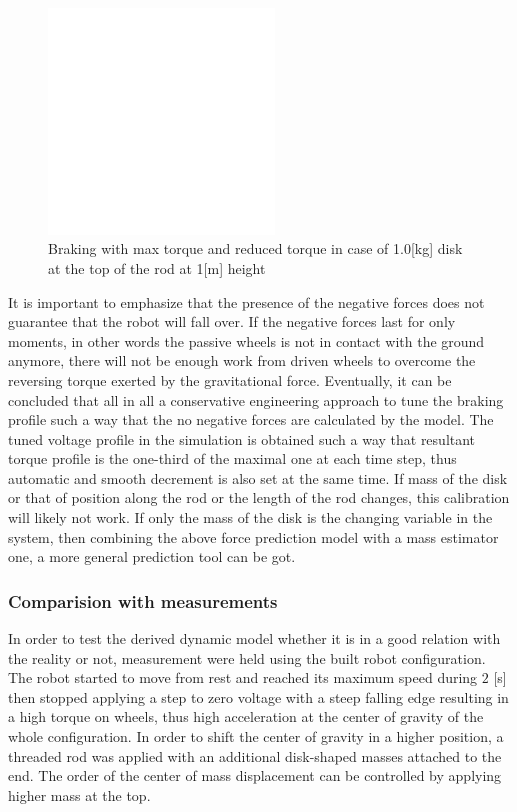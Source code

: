 \documentclass[12pt,english]{article}
\begin{document}
\begin{figure}[htb!]
	\centering
	\includegraphics[height=6cm]{figures/braking_1_0_kg_1_0_m}
	\caption{Braking with max torque and reduced torque in case of 1.0[kg] disk at the top of the rod at 1[m] height}
	\label{braking_1_0_kg_1_0_m}
\end{figure}
It is important to emphasize that the presence of the negative forces does not guarantee that the robot will fall over. If the negative forces last for only moments, in other words the passive wheels is not in contact with the ground anymore, there will not be enough work from driven wheels to overcome the reversing torque exerted by the gravitational force. Eventually, it can be concluded that all in all a conservative engineering approach to tune the braking profile such a way that the no negative forces are calculated by the model. The tuned voltage profile in the simulation is obtained such a way that resultant torque profile is the one-third of the maximal one at each time step, thus automatic and smooth decrement is also set at the same time. If mass of the disk or that of position along the rod or the length of the rod changes, this calibration will likely not work. If only the mass of the disk is the changing variable in the system, then combining the above force prediction model with a mass estimator one, a more general prediction tool can be got.
\subsubsection{Comparision with measurements}
In order to test the derived dynamic model whether it is in a good relation with the reality or not, measurement were held using the built robot configuration. The robot started to move from rest and reached its maximum speed during $2$ [s] then stopped applying a step to zero voltage with a steep falling edge resulting in a high torque on wheels, thus high acceleration at the center of gravity of the whole configuration. In order to shift the center of gravity in a higher position, a threaded rod was applied with an additional disk-shaped masses attached to the end. The order of the center of mass displacement can be controlled by applying higher mass at the top. 
\end{document}
